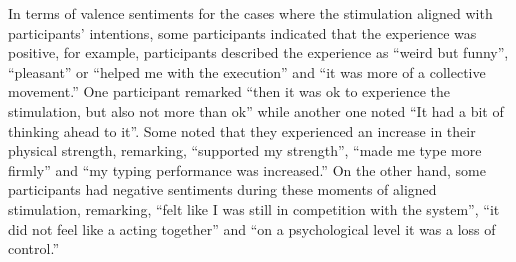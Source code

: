 In terms of valence sentiments for the cases where the stimulation aligned with participants' intentions, some participants indicated that the experience was positive, for example, participants described the experience as ``weird but funny'', ``pleasant'' or ``helped me with the execution'' and ``it was more of a collective movement.'' One participant remarked ``then it was ok to experience the stimulation, but also not more than ok'' while another one noted ``It had a bit of thinking ahead to it''. Some noted that they experienced an increase in their physical strength, remarking, ``supported my strength'', ``made me type more firmly'' and ``my typing performance was increased.'' On the other hand, some participants had negative sentiments during these moments of aligned stimulation, remarking, ``felt like I was still in competition with the system'', ``it did not feel like a acting together'' and ``on a psychological level it was a loss of control.''













